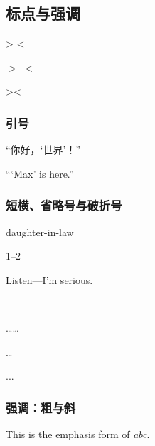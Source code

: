 \documentclass[twoside]{ctexart}
\begin{document}
    \subsection{标点与强调}
            > < 
            
            $>$ $<$ 
            
            \textgreater \textless 
        
            \subsubsection{引号}
            “你好，‘世界’！” 
            
            ``\thinspace`Max' is here.'' 
    
        \subsubsection{短横、省略号与破折号}
            daughter-in-law

            1--2
            
            Listen---I'm serious.
        
            ——
            
            ……
            
            \ldots
            
            ...

	    \subsubsection{强调：粗与斜}
            This is the emphasis form of \emph{abc}.
    
\end{document}
